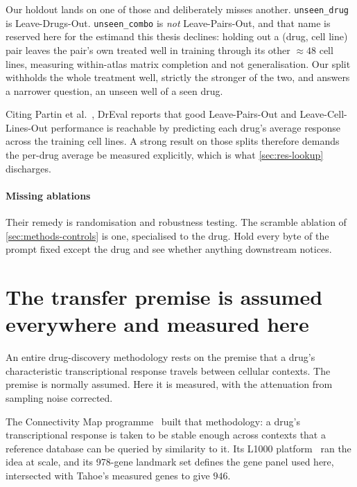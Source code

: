 Our holdout lands on one of those and deliberately misses another.
\texttt{unseen\_drug} is Leave-Drugs-Out. \texttt{unseen\_combo} is \emph{not}
Leave-Pairs-Out, and that name is reserved here for the estimand this thesis
declines: holding out a (drug, cell line) pair leaves the pair's own treated well
in training through its other $\approx 48$ cell lines, measuring within-atlas
matrix completion and not generalisation. Our split withholds the whole treatment
well, strictly the stronger of the two, and answers a narrower question, an
unseen well of a seen drug.

Citing Partin et al.~\cite{partin}, DrEval reports that good Leave-Pairs-Out and
Leave-Cell-Lines-Out performance is reachable by predicting each drug's
average response across the training cell lines. A strong result on those splits
therefore demands the per-drug average be measured explicitly, which is what
\cref{sec:res-lookup} discharges.

\paragraph{Missing ablations} Their remedy is randomisation and robustness
testing. The scramble ablation of \cref{sec:methods-controls} is one, specialised
to the drug. Hold every byte of the prompt fixed except the drug and see whether
anything downstream notices.

\section{The transfer premise is assumed everywhere and measured here}
\label{sec:lit-cmap}
\framedecl{-}

\begin{question}
An entire drug-discovery methodology rests on the premise that a drug's
characteristic transcriptional response travels between cellular contexts. The
premise is normally assumed. Here it is measured, with the attenuation from
sampling noise corrected.
\end{question}

\noindent
The Connectivity Map programme~\cite{cmap,l1000} built that methodology: a drug's
transcriptional response is taken to be stable enough across contexts that a
reference database can be queried by similarity to it. Its L1000
platform~\cite{l1000} ran the idea at scale, and its 978-gene landmark set
defines the gene panel used here, intersected with Tahoe's measured genes to give
$946$.

